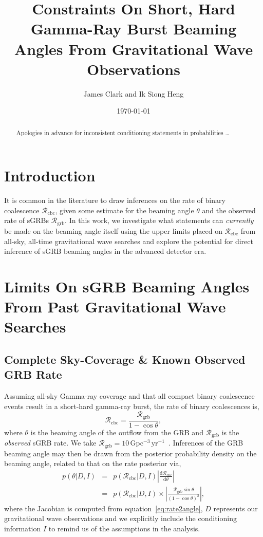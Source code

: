 \documentclass[twocolumn,nofootinbib]{revtex4}
\newcommand{\gw}{gravitational wave }
\newcommand{\grbrate}{{{\mathcal R}_{\mathrm{grb}}}}
\newcommand{\cbcrate}{{{\mathcal R}_{\mathrm{cbc}}}}
\newcommand{\diff}{{\mathrm d}}
\begin{document}
\title{Constraints On Short, Hard Gamma-Ray Burst Beaming Angles From
Gravitational Wave Observations}
\author{James Clark and Ik Siong Heng}
\date{\today}

\begin{abstract}
Apologies in advance for inconsistent conditioning statements in probabilities
\dots
\end{abstract}

\maketitle

\section{Introduction}

It is common in the literature to draw inferences on the rate of binary
coalescence $\cbcrate$, given some estimate for the beaming angle $\theta$ and
the observed rate of sGRBs $\grbrate$.  In this work, we investigate what
statements can \emph{currently} be made on the beaming angle itself using the
upper limits placed on $\cbcrate$ from all-sky, all-time \gw searches and
explore the potential for direct inference of sGRB  beaming angles in the
advanced detector era.

\section{Limits On sGRB Beaming Angles From Past Gravitational Wave Searches}

\subsection{Complete Sky-Coverage \& Known Observed GRB Rate}
Assuming all-sky Gamma-ray coverage and that all compact binary coalescence
events result in a short-hard gamma-ray burst, the rate of binary coalescences
is,
%
\begin{equation}\label{eq:rate2angle}
\cbcrate=\frac{\grbrate}{1-\cos \theta},
\end{equation}
where $\theta$ is the beaming angle of the outflow from the GRB and $\grbrate$
is the \emph{observed} sGRB rate.  We take
$\grbrate=10$\,Gpc$^{-3}$\,yr$^{-1}$~\cite{nakar-2007,Dietz11}.
%
Inferences of the GRB beaming angle may then be drawn from the posterior
probability density on the beaming angle, related to that on the rate posterior
via,
%
\begin{eqnarray}
p(\theta|D,I) & = & p(\cbcrate|D,I) \left|\frac{\diff \cbcrate}{\diff
\theta}\right| \\
\label{eq:rate2angleProb}
& = & p(\cbcrate|D,I) \times \left| \frac{\grbrate\sin\theta}{(1-\cos \theta)^2} \right|,
\end{eqnarray}
%
where the Jacobian is computed from equation~\ref{eq:rate2angle}, $D$ represents
our \gw observations and we explicitly include the conditioning information $I$
to remind us of the assumptions in the analysis.
\end{document}
